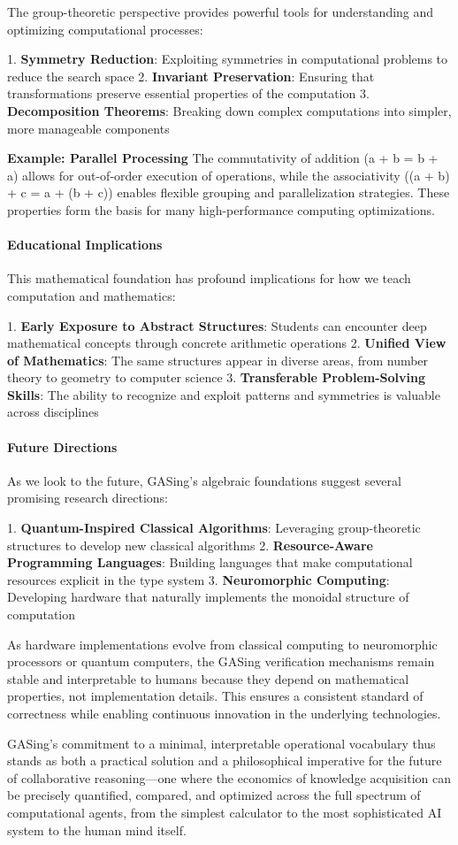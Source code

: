 The group-theoretic perspective provides powerful tools for understanding and optimizing computational processes:

1. \textbf{Symmetry Reduction}: Exploiting symmetries in computational problems to reduce the search space
2. \textbf{Invariant Preservation}: Ensuring that transformations preserve essential properties of the computation
3. \textbf{Decomposition Theorems}: Breaking down complex computations into simpler, more manageable components

\textbf{Example: Parallel Processing}
The commutativity of addition (a + b = b + a) allows for out-of-order execution of operations, while the associativity ((a + b) + c = a + (b + c)) enables flexible grouping and parallelization strategies. These properties form the basis for many high-performance computing optimizations.
\paragraph{Educational Implications}

This mathematical foundation has profound implications for how we teach computation and mathematics:

1. \textbf{Early Exposure to Abstract Structures}: Students can encounter deep mathematical concepts through concrete arithmetic operations
2. \textbf{Unified View of Mathematics}: The same structures appear in diverse areas, from number theory to geometry to computer science
3. \textbf{Transferable Problem-Solving Skills}: The ability to recognize and exploit patterns and symmetries is valuable across disciplines
\paragraph{Future Directions}

As we look to the future, GASing's algebraic foundations suggest several promising research directions:

1. \textbf{Quantum-Inspired Classical Algorithms}: Leveraging group-theoretic structures to develop new classical algorithms
2. \textbf{Resource-Aware Programming Languages}: Building languages that make computational resources explicit in the type system
3. \textbf{Neuromorphic Computing}: Developing hardware that naturally implements the monoidal structure of computation

As hardware implementations evolve from classical computing to neuromorphic processors or quantum computers, the GASing verification mechanisms remain stable and interpretable to humans because they depend on mathematical properties, not implementation details. This ensures a consistent standard of correctness while enabling continuous innovation in the underlying technologies.

GASing's commitment to a minimal, interpretable operational vocabulary thus stands as both a practical solution and a philosophical imperative for the future of collaborative reasoning—one where the economics of knowledge acquisition can be precisely quantified, compared, and optimized across the full spectrum of computational agents, from the simplest calculator to the most sophisticated AI system to the human mind itself.
